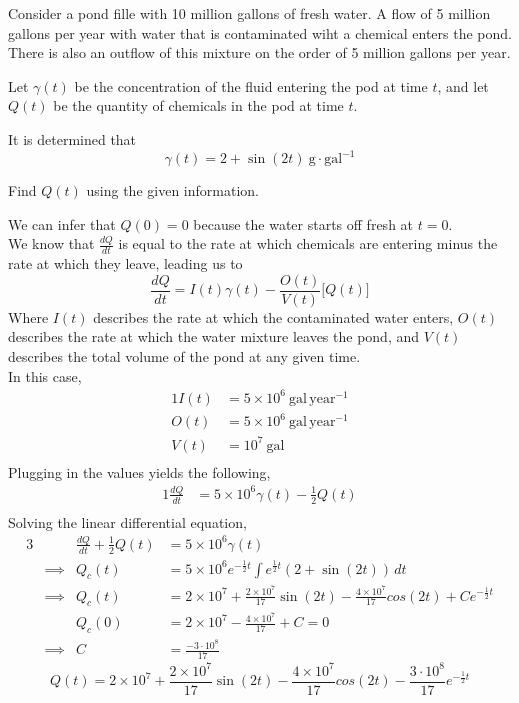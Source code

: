 \documentclass[twoside]{report}
\begin{document}
    \np
    \begin{example}[Modelling]
        Consider a pond fille with 10 million gallons of fresh water. A flow of 5 million gallons per year with water that is contaminated wiht a chemical enters the pond. There is also an outflow of this mixture on the order of 5 million gallons per year.\bigskip

        \noindent Let $\gamma(t)$ be the concentration of the fluid entering the pod at time $t$, and let $Q(t)$ be the quantity of chemicals in the pod at time $t$.\bigskip
        
        \noindent It is determined that
        \[\gamma(t) = 2 + \sin(2t)\ \text{g}\cdot\text{gal}^{-1}\]

        \noindent Find $Q(t)$ using the given information.\bigskip

        \noindent We can infer that $Q(0) = 0$ because the water starts off fresh at $t = 0$.\\
        We know that $\frac{dQ}{dt}$ is equal to the rate at which chemicals are entering minus the rate at which they leave, leading us to
        \[\frac{dQ}{dt} = I(t)\gamma(t) - \frac{O(t)}{V(t)}\big[Q(t)\big]\]
        Where $I(t)$ describes the rate at which the contaminated water enters, $O(t)$ describes the rate at which the water mixture leaves the pond, and $V(t)$ describes the total volume of the pond at any given time.\\
        In this case,
        \begin{alignat}{1}
            I(t) &= 5\times 10^{6}\ \text{gal}\,\text{year}^{-1}\\
            O(t) &= 5\times 10^{6}\ \text{gal}\,\text{year}^{-1}\\
            V(t) &= 10^{7}\ \text{gal}\\
        \end{alignat}
        Plugging in the values yields the following,
        \begin{alignat}{1}
            \frac{dQ}{dt} &= 5\times 10^{6}\gamma(t) - \frac{1}{2}Q(t)\\
        \end{alignat}
        Solving the linear differential equation,
        \begin{alignat}{3}
            &&\frac{dQ}{dt} + \frac{1}{2}Q(t) &=  5\times 10^{6}\gamma(t)\\
            &\implies&Q_{c}(t)&=5\times 10^{6}e^{-\frac{1}{2}t}\int e^{\frac{1}{2}t}(2 + \sin(2t))\,dt\\
            &\implies&Q_{c}(t)&=2\times 10^{7} + \frac{2\times 10^{7}}{17}\sin(2t)-\frac{4\times 10^{7}}{17}cos(2t) + Ce^{-\frac{1}{2}t}\\
            &&Q_{c}(0) &= 2\times 10^{7}-\frac{4\times 10^{7}}{17} + C = 0\\
            &\implies&C&=\frac{-3\cdot10^{8}}{17}
        \end{alignat}
        \begin{equation}    
            Q(t)=2\times 10^{7} + \frac{2\times 10^{7}}{17}\sin(2t)-\frac{4\times 10^{7}}{17}cos(2t) - \frac{3\cdot10^{8}}{17}e^{-\frac{1}{2}t}
        \end{equation}
    \end{example}
\end{document}
